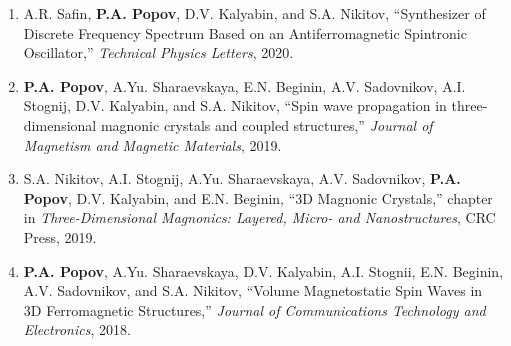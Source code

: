 \documentclass[11pt,a4paper]{article}
\newcommand{\me}[1]{\textbf{#1}} %
\begin{document}
\begin{enumerate}[leftmargin=*,itemsep=4pt,label=\arabic*.]
\item A.R. Safin, \me{P.A. Popov}, D.V. Kalyabin, and S.A. Nikitov, ``Synthesizer of Discrete Frequency Spectrum Based on an Antiferromagnetic Spintronic Oscillator,'' \textit{Technical Physics Letters}, 2020.

\item \me{P.A. Popov}, A.Yu. Sharaevskaya, E.N. Beginin, A.V. Sadovnikov, A.I. Stognij, D.V. Kalyabin, and S.A. Nikitov, ``Spin wave propagation in three-dimensional magnonic crystals and coupled structures,'' \textit{Journal of Magnetism and Magnetic Materials}, 2019.

\item S.A. Nikitov, A.I. Stognij, A.Yu. Sharaevskaya, A.V. Sadovnikov, \me{P.A. Popov}, D.V. Kalyabin, and E.N. Beginin, ``3D Magnonic Crystals,'' chapter in \textit{Three-Dimensional Magnonics: Layered, Micro- and Nanostructures}, CRC Press, 2019.

\item \me{P.A. Popov}, A.Yu. Sharaevskaya, D.V. Kalyabin, A.I. Stognii, E.N. Beginin, A.V. Sadovnikov, and S.A. Nikitov, ``Volume Magnetostatic Spin Waves in 3D Ferromagnetic Structures,'' \textit{Journal of Communications Technology and Electronics}, 2018.

\end{enumerate}
\end{document}
